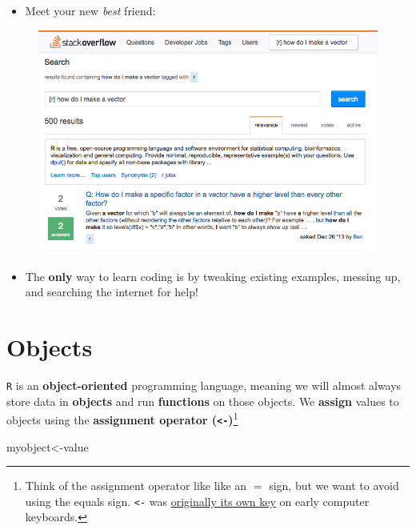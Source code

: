 \documentclass[]{book}
\newenvironment{Shaded}{\begin{snugshade}}{\end{snugshade}}
\newcommand{\NormalTok}[1]{#1}
\providecommand{\tightlist}{%
  \setlength{\itemsep}{0pt}\setlength{\parskip}{0pt}}
\let\rmarkdownfootnote\footnote%
\def\footnote{\protect\rmarkdownfootnote}
\theoremstyle{definition}
\theoremstyle{definition}
\theoremstyle{definition}
\theoremstyle{remark}
\begin{document}
\begin{itemize}
\tightlist
\item
  Meet your new \emph{best} friend:
\end{itemize}

\begin{figure}
\centering
\includegraphics{images/stackoverflow.png}
\caption{}
\end{figure}

\begin{itemize}
\tightlist
\item
  The \textbf{only} way to learn coding is by tweaking existing
  examples, messing up, and searching the internet for help!
\end{itemize}

\chapter*{Objects}\label{objects}

\texttt{R} is an \textbf{object-oriented} programming language, meaning
we will almost always store data in \textbf{objects} and run
\textbf{functions} on those objects. We \textbf{assign} values to
objects using the \textbf{assignment operator
(\texttt{\textless{}-})}\footnote{Think of the assignment operator like
  like an \(=\) sign, but we want to avoid using the equals sign.
  \texttt{\textless{}-} was
  \href{https://twitter.com/kwbroman/status/747829864091127809}{originally
  its own key} on early computer keyboards.}

\begin{Shaded}
\begin{Highlighting}[]
\NormalTok{myobject<-value}
\end{Highlighting}
\end{Shaded}
\end{document}
